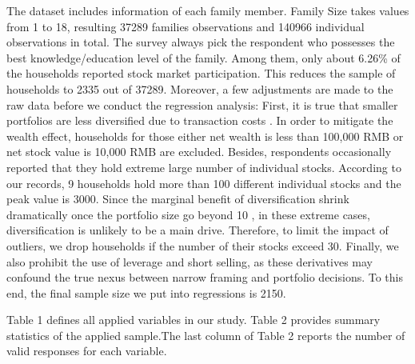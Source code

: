 \documentclass[ukenglish,nottitlepage,thmsb,11pt,letterpaper]{article}
\begin{document}
The dataset includes information of each family member. Family Size takes values from 1 to 18, resulting 37289 families observations and 140966 individual observations in total. The survey always pick the respondent who possesses the best knowledge/education level of the family. Among them, only about 6.26\% of the households reported stock market participation. This reduces the sample of households to 2335 out of 37289. Moreover, a few adjustments are made to the raw data before we conduct the regression analysis: First, it is true that smaller portfolios are less diversified due to transaction costs \citep{Vissing-Jorgensen2002,Vissing-Jorgensen2003,Goetzmann2008}.  In order to mitigate the wealth effect, households for those either net wealth is less than 100,000 RMB or net stock value is 10,000 RMB are excluded. Besides, respondents occasionally reported that they hold extreme large number of individual stocks. According to our records, 9 households hold more than 100 different individual stocks and the peak value is 3000. Since the marginal benefit of diversification shrink dramatically once the portfolio size go beyond 10 \citep{Evans1968}, in these extreme cases, diversification is unlikely to be a main drive. Therefore, to limit the impact of outliers, we drop households if the number of their stocks exceed 30. Finally, we also prohibit the use of leverage and short selling, as these derivatives may confound the true nexus between narrow framing and portfolio decisions. To this end, the final sample size we put into regressions is 2150.

Table 1 defines all applied variables in our study. Table 2 provides summary statistics of the applied sample.The last column of Table 2 reports the number of valid responses for each variable. 
\end{document}
